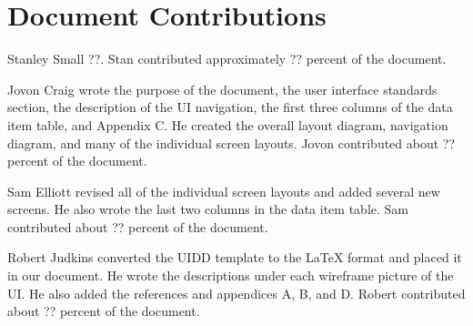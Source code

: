 \documentclass{article}
\begin{document}
\newpage
\section{Document Contributions}

Stanley Small ??. Stan contributed approximately ?? percent of the document.

Jovon Craig wrote the purpose of the document, the user interface standards section, the description of the UI navigation, the first three columns of the data item table, and Appendix C. He created the overall layout diagram, navigation diagram, and many of the individual screen layouts. Jovon contributed about ?? percent of the document.

Sam Elliott revised all of the individual screen layouts and added several new screens. He also wrote the last two columns in the data item table. Sam contributed about ?? percent of the document.

Robert Judkins converted the UIDD template to the LaTeX format and placed it in our document. He wrote the descriptions under each wireframe picture of the UI. He also added the references and appendices A, B, and D. Robert contributed about ?? percent of the document.

\newpage



\end{document}
